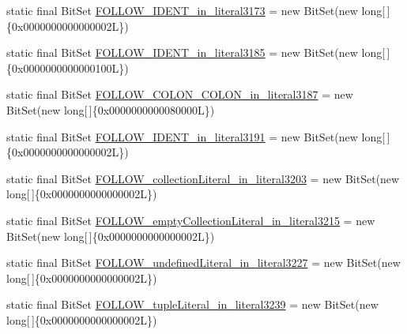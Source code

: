 \begin{DoxyCompactItemize}
\item 
static final Bit\-Set \hyperlink{classorg_1_1tzi_1_1use_1_1parser_1_1shell_1_1_shell_command_parser_acdfa4811ced21ffeb729c5676792fa30}{F\-O\-L\-L\-O\-W\-\_\-\-I\-D\-E\-N\-T\-\_\-in\-\_\-literal3173} = new Bit\-Set(new long\mbox{[}$\,$\mbox{]}\{0x0000000000000002\-L\})
\item 
static final Bit\-Set \hyperlink{classorg_1_1tzi_1_1use_1_1parser_1_1shell_1_1_shell_command_parser_aad4e8dc48064967896e6229974aed29f}{F\-O\-L\-L\-O\-W\-\_\-\-I\-D\-E\-N\-T\-\_\-in\-\_\-literal3185} = new Bit\-Set(new long\mbox{[}$\,$\mbox{]}\{0x0000000000000100\-L\})
\item 
static final Bit\-Set \hyperlink{classorg_1_1tzi_1_1use_1_1parser_1_1shell_1_1_shell_command_parser_ae727d25682440b07600151293a35da30}{F\-O\-L\-L\-O\-W\-\_\-\-C\-O\-L\-O\-N\-\_\-\-C\-O\-L\-O\-N\-\_\-in\-\_\-literal3187} = new Bit\-Set(new long\mbox{[}$\,$\mbox{]}\{0x0000000000080000\-L\})
\item 
static final Bit\-Set \hyperlink{classorg_1_1tzi_1_1use_1_1parser_1_1shell_1_1_shell_command_parser_a2ea072f796389209f6c59ed6b820c76b}{F\-O\-L\-L\-O\-W\-\_\-\-I\-D\-E\-N\-T\-\_\-in\-\_\-literal3191} = new Bit\-Set(new long\mbox{[}$\,$\mbox{]}\{0x0000000000000002\-L\})
\item 
static final Bit\-Set \hyperlink{classorg_1_1tzi_1_1use_1_1parser_1_1shell_1_1_shell_command_parser_aa7fdc5d341c3eff92859253384f9457a}{F\-O\-L\-L\-O\-W\-\_\-collection\-Literal\-\_\-in\-\_\-literal3203} = new Bit\-Set(new long\mbox{[}$\,$\mbox{]}\{0x0000000000000002\-L\})
\item 
static final Bit\-Set \hyperlink{classorg_1_1tzi_1_1use_1_1parser_1_1shell_1_1_shell_command_parser_a39377f4e5d631a997676104ff661d20e}{F\-O\-L\-L\-O\-W\-\_\-empty\-Collection\-Literal\-\_\-in\-\_\-literal3215} = new Bit\-Set(new long\mbox{[}$\,$\mbox{]}\{0x0000000000000002\-L\})
\item 
static final Bit\-Set \hyperlink{classorg_1_1tzi_1_1use_1_1parser_1_1shell_1_1_shell_command_parser_a00678579a47a9de63860889661e0d7b9}{F\-O\-L\-L\-O\-W\-\_\-undefined\-Literal\-\_\-in\-\_\-literal3227} = new Bit\-Set(new long\mbox{[}$\,$\mbox{]}\{0x0000000000000002\-L\})
\item 
static final Bit\-Set \hyperlink{classorg_1_1tzi_1_1use_1_1parser_1_1shell_1_1_shell_command_parser_adf8047b2082b83ee2c274bded5126df4}{F\-O\-L\-L\-O\-W\-\_\-tuple\-Literal\-\_\-in\-\_\-literal3239} = new Bit\-Set(new long\mbox{[}$\,$\mbox{]}\{0x0000000000000002\-L\})
\item 

\end{DoxyCompactItemize}

